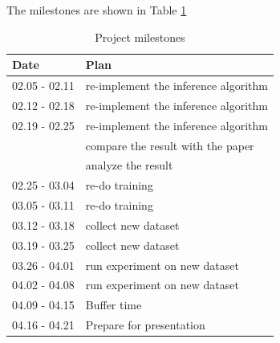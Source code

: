 \documentclass[10pt,twocolumn,letterpaper]{article}
\begin{document}
The milestones are shown in Table \ref{tab:6}
\begin{table}[t]
  \centering
  \begin{tabular}{|l|p{5.5 cm}|}
    \hline
    Date          & Plan \\
    \hline
    02.05 - 02.11 & re-implement the inference algorithm \\
    02.12 - 02.18 & re-implement the inference algorithm \\
    02.19 - 02.25 & re-implement the inference algorithm \\
                  & compare the result with the paper \\
                  & analyze the result \\
    02.25 - 03.04 & re-do training \\
    03.05 - 03.11 & re-do training \\
    03.12 - 03.18 & collect new dataset \\
    03.19 - 03.25 & collect new dataset \\
    03.26 - 04.01 & run experiment on new dataset \\
    04.02 - 04.08 & run experiment on new dataset \\
    04.09 - 04.15 & Buffer time \\
    04.16 - 04.21 & Prepare for presentation \\
    \hline
  \end{tabular}
  \caption{Project milestones}
  \label{tab:6}
\end{table}

\end{document}
